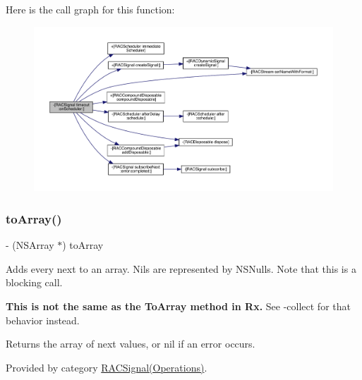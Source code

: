 Here is the call graph for this function\+:\nopagebreak
\begin{figure}[H]
\begin{center}
\leavevmode
\includegraphics[width=350pt]{interface_r_a_c_signal_a8c5f03f4cc8a132e91a985f3d5ccebc0_cgraph}
\end{center}
\end{figure}
\mbox{\label{interface_r_a_c_signal_a5b7a649ea4635f423b73cd4924652fe5}} 
\subsubsection{\texorpdfstring{to\+Array()}{toArray()}\hspace{0.1cm}{\footnotesize\ttfamily [1/3]}}
{\footnotesize\ttfamily -\/ (N\+S\+Array $\ast$) to\+Array \begin{DoxyParamCaption}{ }\end{DoxyParamCaption}}

Adds every {\ttfamily next} to an array. Nils are represented by N\+S\+Nulls. Note that this is a blocking call.

{\bfseries This is not the same as the {\ttfamily To\+Array} method in Rx.} See -\/collect for that behavior instead.

Returns the array of {\ttfamily next} values, or nil if an error occurs. 

Provided by category \mbox{\hyperlink{category_r_a_c_signal_07_operations_08_a5b7a649ea4635f423b73cd4924652fe5}{R\+A\+C\+Signal(\+Operations)}}.

\mbox{\label{interface_r_a_c_signal_a5b7a649ea4635f423b73cd4924652fe5}} 
